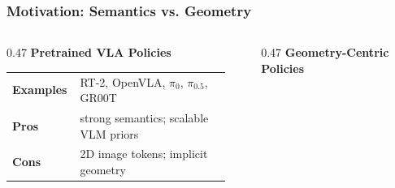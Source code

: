 \documentclass[aspectratio=169,11pt]{beamer}
\begin{document}
\begin{frame}
  \frametitle{Motivation: Semantics vs. Geometry}

  \vspace{0.02cm}

  \begin{columns}[T,onlytextwidth]
    \begin{column}{0.47\textwidth}
      \textbf{Pretrained VLA Policies}

      \vspace{0.08cm}
      \begin{center}
      \end{center}

      \vspace{0.10cm}

      {\small
      \renewcommand{\arraystretch}{1.18}
      \begin{tabular}{@{}p{0.25\linewidth}p{0.67\linewidth}@{}}
        \textbf{Examples} & RT-2, OpenVLA, $\pi_0$, $\pi_{0.5}$, GR00T \\
        \textbf{Pros}     & strong semantics; scalable VLM priors \\
        \textbf{Cons}     & 2D image tokens; implicit geometry
      \end{tabular}
      }
    \end{column}

    \begin{column}{0.47\textwidth}
      \textbf{Geometry-Centric Policies}

      \vspace{0.08cm}
      \begin{center}
      \end{center}


\end{column}
\end{columns}
\end{frame}
\end{document}
